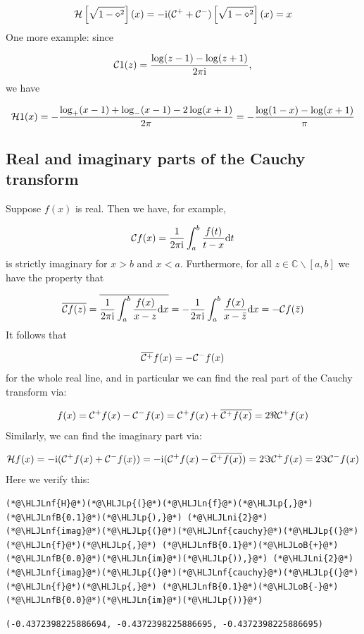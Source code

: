 \documentclass[12pt,a4paper]{article}
\newcommand{\HLJLn}[1]{#1}
\newcommand{\HLJLnf}[1]{\textcolor[RGB]{66,102,213}{#1}}
\newcommand{\HLJLnfB}[1]{\textcolor[RGB]{59,151,46}{#1}}
\newcommand{\HLJLni}[1]{\textcolor[RGB]{59,151,46}{#1}}
\newcommand{\HLJLoB}[1]{\textcolor[RGB]{102,102,102}{\textbf{#1}}}
\newcommand{\HLJLp}[1]{#1}
\def\D{ {\rm d} }
\def\I{ {\rm i} }
\def\C{ {\mathbb C} }
\def\CC{ {\cal C} }
\def\HH{ {\cal H} }
\def\dx{\D x}
\def\dt{\D t}
\begin{document}
\[
{\cal H}\left[{\sqrt{1-\diamond^2}}\right](x) = -\I (\CC^+  + \CC^-) \left[{\sqrt{1-\diamond^2}}\right](x) = x 
\]
One more example: since

\[
\CC 1(z) = {\log(z-1) - \log(z+1) \over 2 \pi \I},
\]
we have 

\[
\HH 1(x) = -{\log_+(x-1) + \log_-(x-1) - 2\log(x+1) \over 2\pi} = -{\log(1-x) - \log(x+1) \over \pi}
\]
\subsection{Real and imaginary parts of the Cauchy transform}
Suppose $f(x)$ is real. Then we have, for example,

\[
\CC f(x) = {1 \over 2 \pi \I} \int_a^b {f(t) \over t- x} \dt
\]
is strictly imaginary for $x > b$ and $x < a$.  Furthermore, for all  $z \in \C \backslash [a,b]$ we have the property that

\[
\overline{\CC f( z)} = \overline{{1 \over 2 \pi \I} \int_a^b {f(x) \over x - z} \dx} = 
-{1 \over 2 \pi \I} \int_a^b {f(x) \over x - \bar z} \dx = - \CC f(\bar z)
\]
It follows that

\[
\overline{\CC^+} f(x) = - \CC^- f(x)
\]
for the whole real line, and in particular we can find the real part of the Cauchy transform via: 

\[
f(x) = \CC^+ f(x) - \CC^- f(x) = \CC^+ f(x) + \overline{\CC^+ f(x)} = 2 \Re \CC^+ f(x)
\]
Similarly, we can find the imaginary part via:

\[
{\cal H} f(x) = -\I(\CC^+ f(x) + \CC^- f(x)) = -\I(\CC^+ f(x) - \overline{\CC^+ f(x)}) = 
2 \Im \CC^+ f(x) = 2 \Im \CC^- f(x)
\]
Here we verify this:


\begin{lstlisting}
(*@\HLJLnf{H}@*)(*@\HLJLp{(}@*)(*@\HLJLn{f}@*)(*@\HLJLp{,}@*) (*@\HLJLnfB{0.1}@*)(*@\HLJLp{),}@*) (*@\HLJLni{2}@*)(*@\HLJLnf{imag}@*)(*@\HLJLp{(}@*)(*@\HLJLnf{cauchy}@*)(*@\HLJLp{(}@*)(*@\HLJLn{f}@*)(*@\HLJLp{,}@*) (*@\HLJLnfB{0.1}@*)(*@\HLJLoB{+}@*)(*@\HLJLnfB{0.0}@*)(*@\HLJLn{im}@*)(*@\HLJLp{)),}@*) (*@\HLJLni{2}@*)(*@\HLJLnf{imag}@*)(*@\HLJLp{(}@*)(*@\HLJLnf{cauchy}@*)(*@\HLJLp{(}@*)(*@\HLJLn{f}@*)(*@\HLJLp{,}@*) (*@\HLJLnfB{0.1}@*)(*@\HLJLoB{-}@*)(*@\HLJLnfB{0.0}@*)(*@\HLJLn{im}@*)(*@\HLJLp{))}@*)
\end{lstlisting}

\begin{lstlisting}
(-0.4372398225886694, -0.4372398225886695, -0.4372398225886695)
\end{lstlisting}
\end{document}
